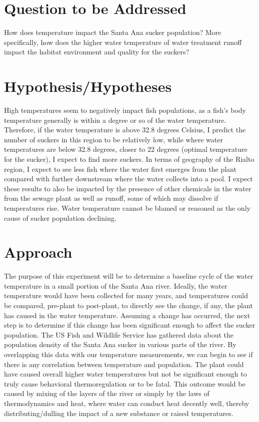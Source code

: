 \documentclass{tufte-handout}
\begin{document}
\section{Question to be Addressed} How does temperature impact the Santa Ana sucker population? More specifically, how does the higher water temperature of water treatment runoff impact the habitat environment and quality for the suckers?

\section{Hypothesis/Hypotheses} High temperatures seem to negatively impact fish populations, as a fish's body temperature generally is within a degree or so of the water temperature. Therefore, if the water temperature is above 32.8 degrees Celsius, I predict the number of suckers in this region to be relatively low, while where water temperatures are below 32.8 degrees, closer to 22 degrees (optimal temperature for the sucker), I expect to find more suckers. In terms of geography of the Rialto region, I expect to see less fish where the water first emerges from the plant compared with further downstream where the water collects into a pool. I expect these results to also be impacted by the presence of other chemicals in the water from the sewage plant as well as runoff, some of which may dissolve if temperatures rise. Water temperature cannot be blamed or reasoned as the only cause of sucker population declining.

\section{Approach}
  The purpose of this experiment will be to determine a baseline cycle of the water temperature in a small portion of the Santa Ana river. Ideally, the water temperature would have been collected for many years, and temperatures could be compared, pre-plant to post-plant, to directly see the change, if any, the plant has caused in the water temperature. Assuming a change has occurred, the next step is to determine if this change has been significant enough to affect the sucker population. The US Fish and Wildlife Service has gathered data about the population density of the Santa Ana sucker in various parts of the river. By overlapping this data with our temperature measurements, we can begin to see if there is any correlation between temperature and population. The plant could have caused overall higher water temperatures but not be significant enough to truly cause behavioral thermoregulation or to be fatal. This outcome would be caused by mixing of the layers of the river or simply by the laws of thermodynamics and heat, where water can conduct heat decently well, thereby distributing/dulling the impact of a new substance or raised temperatures. 
 
\end{document}
